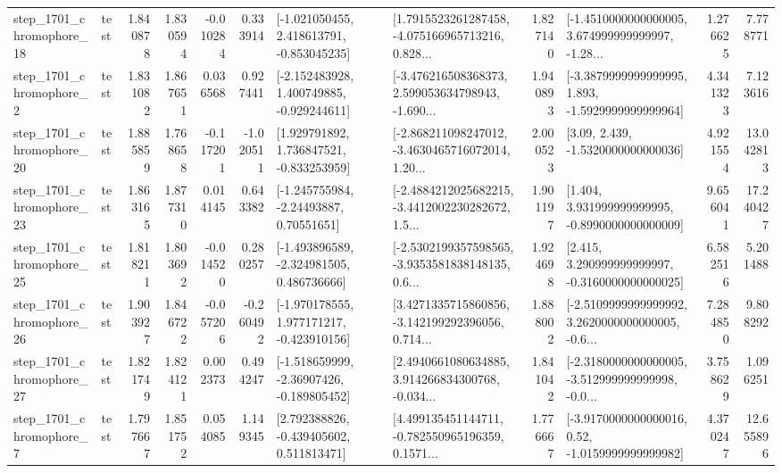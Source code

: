 \begin{tabular}{llrrrrllrlrr}
 step\_1701\_chromophore\_18 &      test &      1.840878 &    1.830594 &     -0.010284 &  0.333914 &   [-1.021050455, 2.418613791, -0.853045235] &  [1.7915523261287458, -4.075166965713216, 0.828... &       1.827140 &  [-1.4510000000000005, 3.674999999999997, -1.28... &            1.276625 &          7.778771 \\
  step\_1701\_chromophore\_2 &      test &      1.831082 &    1.867651 &      0.036568 &  0.927441 &   [-2.152483928, 1.400749885, -0.929244611] &  [-3.476216508368373, 2.599053634798943, -1.690... &       1.940893 &  [-3.3879999999999995, 1.893, -1.5929999999999964] &            4.341323 &          7.123616 \\
 step\_1701\_chromophore\_20 &      test &      1.885859 &    1.768658 &     -0.117201 & -1.020511 &    [1.929791892, 1.736847521, -0.833253959] &  [-2.868211098247012, -3.4630465716072014, 1.20... &       2.000523 &                 [3.09, 2.439, -1.5320000000000036] &            4.921554 &         13.042813 \\
 step\_1701\_chromophore\_23 &      test &      1.863165 &    1.877310 &      0.014145 &  0.643382 &     [-1.245755984, -2.24493887, 0.70551651] &  [-2.4884212025682215, -3.4412002230282672, 1.5... &       1.901197 &    [1.404, 3.931999999999995, -0.8990000000000009] &            9.656041 &         17.240427 \\
 step\_1701\_chromophore\_25 &      test &      1.818211 &    1.803692 &     -0.014520 &  0.280257 &   [-1.493896589, -2.324981505, 0.486736666] &  [-2.5302199357598565, -3.9353581838148135, 0.6... &       1.924698 &    [2.415, 3.290999999999997, -0.3160000000000025] &            6.582516 &          5.201488 \\
 step\_1701\_chromophore\_26 &      test &      1.903927 &    1.846722 &     -0.057206 & -0.260492 &   [-1.970178555, 1.977171217, -0.423910156] &  [3.4271335715860856, -3.142199292396056, 0.714... &       1.888002 &  [-2.5109999999999992, 3.2620000000000005, -0.6... &            7.284850 &          9.808292 \\
 step\_1701\_chromophore\_27 &      test &      1.821749 &    1.824121 &      0.002373 &  0.494247 &   [-1.518659999, -2.36907426, -0.189805452] &  [2.4940661080634885, 3.914266834300768, -0.034... &       1.841042 &  [-2.3180000000000005, -3.512999999999998, -0.0... &            3.758629 &          1.096251 \\
  step\_1701\_chromophore\_7 &      test &      1.797667 &    1.851752 &      0.054085 &  1.149345 &    [2.792388826, -0.439405602, 0.511813471] &  [4.499135451144711, -0.782550965196359, 0.1571... &       1.776667 &   [-3.9170000000000016, 0.52, -1.0159999999999982] &            4.370247 &         12.655896 \\

\end{tabular}
